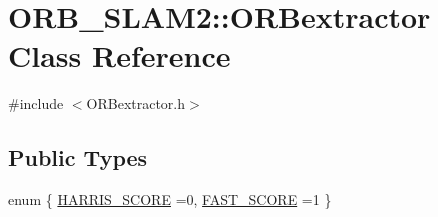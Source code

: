 \hypertarget{class_o_r_b___s_l_a_m2_1_1_o_r_bextractor}{}\section{O\+R\+B\+\_\+\+S\+L\+A\+M2\+:\+:O\+R\+Bextractor Class Reference}
\label{class_o_r_b___s_l_a_m2_1_1_o_r_bextractor}


{\ttfamily \#include $<$O\+R\+Bextractor.\+h$>$}

\subsection*{Public Types}
\begin{DoxyCompactItemize}
\item 
enum \{ \mbox{\hyperlink{class_o_r_b___s_l_a_m2_1_1_o_r_bextractor_a5f326a8b3ba190c121dcdeea1d287f69a0f496d253d29ce9b88ab80575b311b56}{H\+A\+R\+R\+I\+S\+\_\+\+S\+C\+O\+RE}} =0, 
\mbox{\hyperlink{class_o_r_b___s_l_a_m2_1_1_o_r_bextractor_a5f326a8b3ba190c121dcdeea1d287f69a504fff69083dc0081dbb34ac5d9c00b3}{F\+A\+S\+T\+\_\+\+S\+C\+O\+RE}} =1
 \}
\end{DoxyCompactItemize}
